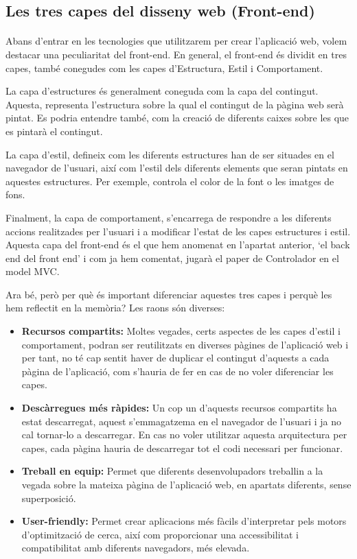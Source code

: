 \subsection{Les tres capes del disseny web (Front-end)}

    \paragraph{}
    Abans d'entrar en les tecnologies que utilitzarem per crear l’aplicació web, volem destacar una peculiaritat del front-end. En general, el front-end és dividit en tres capes, també conegudes com les capes d’Estructura, Estil i Comportament.

    La capa d'estructures és generalment coneguda com la capa del contingut. A\-ques\-ta, representa l'estructura sobre la qual el contingut de la pàgina web serà pintat. Es podria entendre també, com la creació de diferents caixes sobre les que es pintarà el contingut.

    La capa d'estil, defineix com les diferents estructures han de ser situades en el navegador de l’usuari, així com l'estil dels diferents elements que seran pintats en aquestes estructures. Per exemple, controla el color de la font o les imatges de fons.

    Finalment, la capa de comportament, s'encarrega de respondre a les diferents accions realitzades per l'usuari i a modificar l’estat de les capes estructures i estil. Aquesta capa del front-end és el que hem anomenat en l'apartat anterior, `el back end del front end’ i com ja hem comentat, jugarà el paper de Controlador en el model MVC.

    Ara bé, però per què és important diferenciar aquestes tres capes i perquè les hem reflectit en la memòria? Les raons són diverses:

    \begin{itemize}
        \item \textbf{Recursos compartits:} Moltes vegades, certs aspectes de les capes d'estil i comportament, podran ser reutilitzats en diverses pàgines de l’aplicació web i per tant, no té cap sentit haver de duplicar el contingut d’aquests a cada pàgina de l’aplicació, com s'hauria de fer en cas de no voler diferenciar les capes.
        \item \textbf{Descàrregues més ràpides:} Un cop un d'aquests recursos compartits ha estat descarregat, aquest s’emmagatzema en el navegador de l’usuari i ja no cal tornar-lo a descarregar. En cas no voler utilitzar aquesta arquitectura per capes, cada pàgina hauria de descarregar tot el codi necessari per funcionar.
        \item \textbf{Treball en equip:} Permet que diferents desenvolupadors treballin a la vegada sobre la mateixa pàgina de l’aplicació web, en apartats diferents, sense superposició.
        \item \textbf{User-friendly:} Permet crear aplicacions més fàcils d’interpretar pels motors d’optimització de cerca, així com proporcionar una accessibilitat i com\-pa\-ti\-bi\-li\-tat amb diferents navegadors, més elevada.
    \end{itemize}
